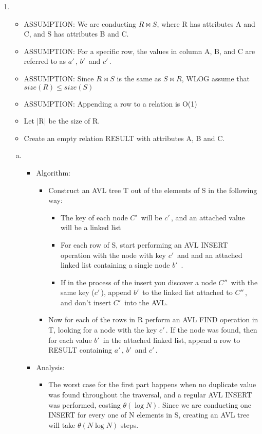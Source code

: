 \documentclass[11pt]{article}
\begin{document}
\begin{enumerate}
\begin{enumerate}[a)]
\begin{enumerate}
					\end{enumerate}
			\end{enumerate}
		\item %
			\begin{itemize}
				\item ASSUMPTION: We are conducting $R \bowtie S$, where R has attributes A and C, and S has attributes B and C.
				\item ASSUMPTION: For a specific row, the values in column A, B, and C are  referred to as $a'\,\! $, $b'\,\! $ and $c'\,\! $.
				\item ASSUMPTION: Since $R \bowtie S$ is the same as $S \bowtie R$, WLOG assume that $size(R) \le size(S)$
				\item ASSUMPTION: Appending a row to a relation is O(1)
				\item Let |R| be the size of R.
				\item Create an empty relation RESULT with attributes A, B and C.
			\end{itemize}
			
			\begin{enumerate}[a)]
				\item 
					\begin{itemize}
						\item Algorithm:
							\begin{itemize}
								\item Construct an AVL tree T out of the elements of S in the following way:
								\begin{itemize}
									\item The key of each node $C'\,\!$ will be $c'\,\!$, and an attached value will be a linked list
									\item For each row of S, start performing an AVL INSERT operation with the node with key $c'\,\!$ and and an attached linked list containing a single node $b'\,\!$ . 
									\item If in the process of the insert you discover a node $C''\,\!$ with the same key ($c'\,\!$), append $b'\,\!$ to the linked list attached to $C''\,\!$, and don't insert $C'\,\!$ into the AVL.
								\end{itemize}								 
								\item Now for each of the rows in R perform an AVL FIND operation in T, looking for a node with the key $c'\,\! $. If the node was found, then for each value $b'\,\! $ in the attached linked list, append a row to RESULT containing $a'\,\! $, $b'\,\! $ and $c'\,\! $. 
							\end{itemize}
						\item Analysis: 
							\begin{itemize}
								\item The worst case for the first part happens when no duplicate value was found throughout the traversal, and a regular AVL INSERT was performed, costing $\theta(\log N)$. Since we are conducting one INSERT for every one of N elements in S, creating an AVL tree will take $\theta(N \log N)$ steps.


\end{itemize}
\end{itemize}
\end{enumerate}
\end{enumerate}
\end{document}
